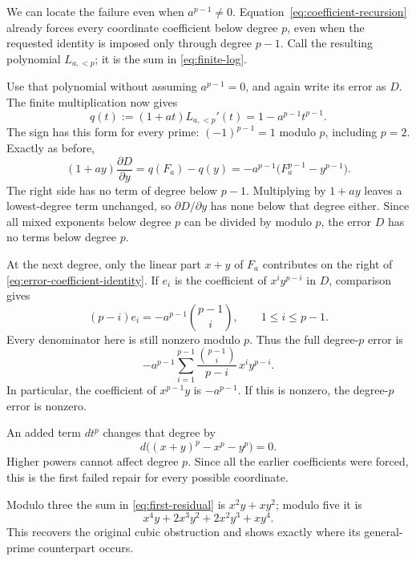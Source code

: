 We can locate the failure even when \(a^{p-1}\ne0\). Equation~\eqref{eq:coefficient-recursion} already forces every coordinate coefficient below degree \(p\), even when the requested identity is imposed only through degree \(p-1\). Call the resulting polynomial \(L_{a,<p}\); it is the sum in \eqref{eq:finite-log}.

Use that polynomial without assuming \(a^{p-1}=0\), and again write its error as \(D\). The finite multiplication now gives
\[
 q(t):=(1+at)L_{a,<p}'(t)=1-a^{p-1}t^{p-1}.
\]
The sign has this form for every prime: \((-1)^{p-1}=1\) modulo \(p\), including \(p=2\). Exactly as before,
\begin{equation}\label{eq:error-coefficient-identity}
 (1+ay)\frac{\partial D}{\partial y}
 =q(F_a)-q(y)
 =-a^{p-1}\bigl(F_a^{p-1}-y^{p-1}\bigr).
\end{equation}
The right side has no term of degree below \(p-1\). Multiplying by \(1+ay\) leaves a lowest-degree term unchanged, so \(\partial D/\partial y\) has none below that degree either. Since all mixed exponents below degree \(p\) can be divided by modulo \(p\), the error \(D\) has no terms below degree \(p\).

At the next degree, only the linear part \(x+y\) of \(F_a\) contributes on the right of \eqref{eq:error-coefficient-identity}. If \(e_i\) is the coefficient of \(x^iy^{p-i}\) in \(D\), comparison gives
\[
 (p-i)e_i=-a^{p-1}\binom{p-1}{i},\qquad 1\le i\le p-1.
\]
Every denominator here is still nonzero modulo \(p\). Thus the full degree-\(p\) error is
\begin{equation}\label{eq:first-residual}
 -a^{p-1}\sum_{i=1}^{p-1}
 \frac{\binom{p-1}{i}}{p-i}\,x^iy^{p-i}.
\end{equation}
In particular, the coefficient of \(x^{p-1}y\) is \(-a^{p-1}\). If this is nonzero, the degree-\(p\) error is nonzero.

An added term \(d t^p\) changes that degree by
\[
 d\bigl((x+y)^p-x^p-y^p\bigr)=0.
\]
Higher powers cannot affect degree \(p\). Since all the earlier coefficients were forced, this is the first failed repair for every possible coordinate.

Modulo three the sum in \eqref{eq:first-residual} is \(x^2y+xy^2\); modulo five it is
\[
 x^4y+2x^3y^2+2x^2y^3+xy^4.
\]
This recovers the original cubic obstruction and shows exactly where its general-prime counterpart occurs.
